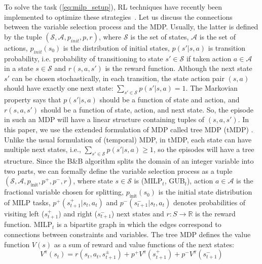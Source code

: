 \documentclass[preprint,12pt]{elsarticle} %
\theoremstyle{plain}
\theoremstyle{definition}
\theoremstyle{remark}
\begin{document}



To solve the task (\ref{eq:milp_setup}), RL techniques have recently been implemented to optimize these strategies~\cite{etheve_2020,mazyavkina2021reinforcement}. Let us discuss the connections between the variable selection process and the MDP. %
Usually, the latter is defined by the tuple $(\mathcal{S}, \mathcal{A}, p_{init}, p, r)$, where $\mathcal{S}$ is the set of states, $\mathcal{A}$ is the set of actions, $p_{init}(s_0)$ is the distribution of initial states, $p(s'|s, a)$ is transition probability, i.e. probability of transitioning to state $s' \in \mathcal{S}$ if taken action $a \in \mathcal{A}$ in a state $s \in \mathcal{S}$ and $r(s, a, s')$ is the reward function. Although the next state $s'$ can be chosen stochastically, in each transition, the state action pair $(s, a)$ should have exactly one next state: $\sum_{s' \in \mathcal{S}}p(s'|s,a) = 1$. The Markovian property says that $p(s'|s, a)$ should be a function of state and action, and $r(s, a, s')$ should be a function of state, action, and next state. So, the episode in such an MDP will have a linear structure containing tuples of $(s, a, s')$. In this paper, we use the extended formulation of MDP called tree MDP (tMDP) \cite{scavuzzo_2022}. Unlike the usual formulation of (temporal) MDP, in tMDP, each state can have multiple next states, i.e., $\sum_{s' \in \mathcal{S}}p(s'|s, a) \geq 1$, so the episodes will have a tree structure. Since the B\&B algorithm splits the domain of an integer variable into two parts, we can formally define the variable selection process as a tuple $(\mathcal{S}, \mathcal{A}, p_{\mathrm{init}}, p^{+}, p^{-}, r)$, where state $s \in \mathcal{S}$ is (MILP$_t$, GUB$_t$), action $a \in \mathcal{A}$ is the fractional variable chosen for splitting, $p_{\mathrm{init}}(s_0)$ is the initial state distribution of MILP tasks, $p^{+}(s_{t+1}^{+}|s_t,a_t)$ and $p^{-}(s_{t+1}^{-}|s_t,a_t)$ denotes probabilities of visiting left ($s^+_{t+1}$) and right ($s^-_{t+1}$) next states and  $r: S \to \mathbb{R}$ is the reward function. MILP$_t$ is a bipartite graph in which the edges correspond to connections between constraints and variables. The tree MDP defines the value function $V(s)$ as a sum of reward and value functions of the next states:
\begin{equation}
    V^{\pi}(s_t) = r(s_t, a_t, s_{t+1}^{\pm}) + p^+V^{\pi}(s_{t+1}^+) + p^-V^{\pi}(s_{t+1}^-)
\label{eq:tmdp_v}
\end{equation}
\end{document}
